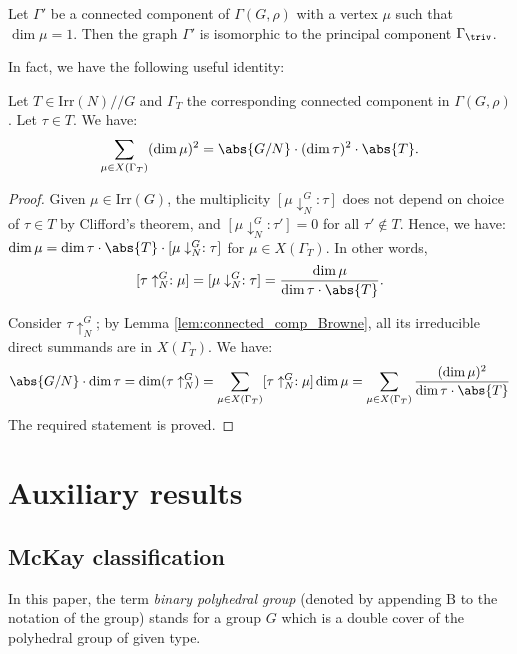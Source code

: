 \begin{coro}\label{cor:conn_comp_isomorphic}
 Let $\Gamma'$ be a connected component of $\Gamma(G, \rho)$ with a vertex $\mu$ such that $\dim \mu=1$. Then the graph $\Gamma'$ is isomorphic to the principal component $\Gamma_{\triv}$.
\end{coro}


In fact, we have the following useful identity:
\begin{lemma}\label{lem:conn_comp_sum_of_sq}
  Let $T \in \mathrm{Irr}(N)//G$ and $\Gamma_T$ the corresponding connected component in $\Gamma(G, \rho)$. Let $\tau \in T$. We have:
 $$\sum_{\mu \in X(\Gamma_T)}(\dim \mu)^2 = \abs{G/N}\cdot (\dim\tau)^2 \cdot \abs{T}. $$
\end{lemma}
\begin{proof}

Given $\mu\in \mathrm{Irr}(G)$, the multiplicity $[\mu \downarrow^G_N: \tau]$ does not depend on choice of $\tau\in T$ by Clifford's theorem, and $[\mu \downarrow^G_N: \tau']=0$ for all $\tau'\notin T$. Hence, we have: $ \dim \mu = \dim \tau \cdot \abs{T} \cdot [\mu \downarrow^G_N: \tau] $ for $\mu \in X(\Gamma_T)$. In other words, $${[\tau\uparrow^G_N: \mu]}=[\mu \downarrow^G_N: \tau] = \frac{\dim \mu }{\dim \tau \cdot \abs{T}}.$$ 

Consider $\tau\uparrow^G_N$; by Lemma \ref{lem:connected_comp_Browne}, all its irreducible direct summands are in $X(\Gamma_T)$. We have: 
\begin{align*}
 \abs{G/N}\cdot\dim \tau  = \dim (\tau\uparrow^G_N) = \sum_{\mu \in X(\Gamma_T)}[\tau\uparrow^G_N: \mu]\dim \mu  = \sum_{\mu \in X(\Gamma_T)}\frac{(\dim \mu )^2}{\dim \tau  \cdot \abs{T}}
\end{align*}
The required statement is proved.
 
\end{proof}

\section{Auxiliary results}\label{sec:Aux}



\subsection{McKay classification}\label{ssec:mckay_class}
In this paper, the term {\it binary polyhedral group} (denoted by appending $\mathrm{B}$ to the notation of the 
group) stands for a group $G$ which is a double cover
of the polyhedral group of given type. 

